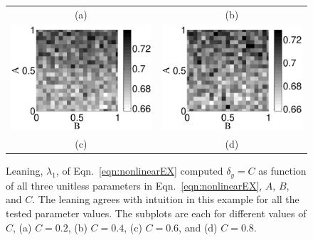 \documentclass[twocolumn,aps,pre,groupedaddress]{revtex4-1}
\begin{document}
\begin{figure}[ht]
\begin{tabular}{cc}
(a) & (b)\\
\includegraphics[scale=0.34]{NonlinearCyclicexample_BxytolC06.eps} &
\includegraphics[scale=0.34]{NonlinearCyclicexample_BxytolC08.eps} \\
(c) & (d) \\
\end{tabular}
\caption{Leaning, $\lambda_1$, of Eqn.\ \ref{eqn:nonlinearEX} computed $\delta_y=C$ as function of all three unitless parameters in Eqn.\ \ref{eqn:nonlinearEX}, $A$, $B$, and $C$.  The leaning agrees with intuition in this example for all the tested parameter values.  The subplots are each for different values of $C$, (a) $C=0.2$, (b) $C=0.4$, (c) $C=0.6$, and (d) $C=0.8$.}
\label{fig:nonlin1}
\end{figure}
\end{document}
